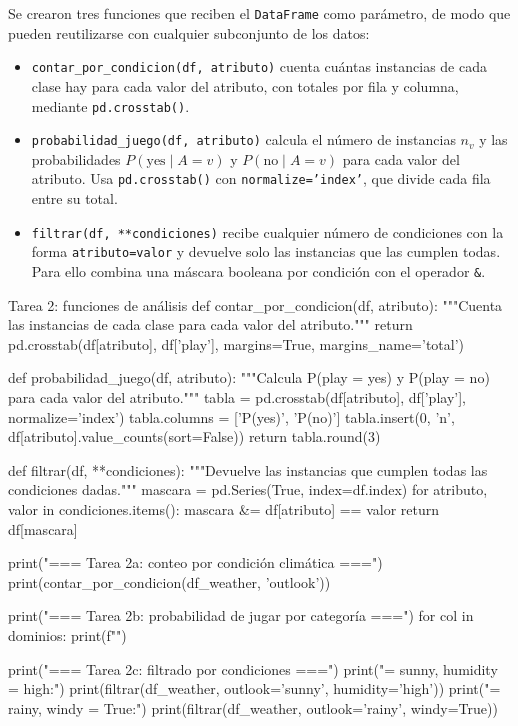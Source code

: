 \documentclass[11pt,letterpaper]{article}
\begin{document}
Se crearon tres funciones que reciben el \texttt{DataFrame} como parámetro, de modo que pueden reutilizarse con cualquier subconjunto de los datos:

\begin{itemize}
    \item \texttt{contar\_por\_condicion(df, atributo)} cuenta cuántas instancias de cada clase hay para cada valor del atributo, con totales por fila y columna, mediante \texttt{pd.crosstab()}.
    \item \texttt{probabilidad\_juego(df, atributo)} calcula el número de instancias $n_v$ y las probabilidades $P(\text{yes} \mid A=v)$ y $P(\text{no} \mid A=v)$ para cada valor del atributo. Usa \texttt{pd.crosstab()} con \texttt{normalize='index'}, que divide cada fila entre su total.
    \item \texttt{filtrar(df, **condiciones)} recibe cualquier número de condiciones con la forma \texttt{atributo=valor} y devuelve solo las instancias que las cumplen todas. Para ello combina una máscara booleana por condición con el operador \texttt{\&}.
\end{itemize}

\begin{codigo}[label=cod:tarea2]{Tarea 2: funciones de análisis}
def contar_por_condicion(df, atributo):
    """Cuenta las instancias de cada clase para cada valor del atributo."""
    return pd.crosstab(df[atributo], df['play'], margins=True, margins_name='total')


def probabilidad_juego(df, atributo):
    """Calcula P(play = yes) y P(play = no) para cada valor del atributo."""
    tabla = pd.crosstab(df[atributo], df['play'], normalize='index')
    tabla.columns = ['P(yes)', 'P(no)']
    tabla.insert(0, 'n', df[atributo].value_counts(sort=False))
    return tabla.round(3)


def filtrar(df, **condiciones):
    """Devuelve las instancias que cumplen todas las condiciones dadas."""
    mascara = pd.Series(True, index=df.index)
    for atributo, valor in condiciones.items():
        mascara &= df[atributo] == valor
    return df[mascara]


print("\n=== Tarea 2a: conteo por condición climática ===")
print(contar_por_condicion(df_weather, 'outlook'))

print("\n=== Tarea 2b: probabilidad de jugar por categoría ===")
for col in dominios:
    print(f"")

print("\n=== Tarea 2c: filtrado por condiciones ===")
print("\noutlook = sunny, humidity = high:")
print(filtrar(df_weather, outlook='sunny', humidity='high'))
print("\noutlook = rainy, windy = True:")
print(filtrar(df_weather, outlook='rainy', windy=True))
\end{codigo}
\end{document}
